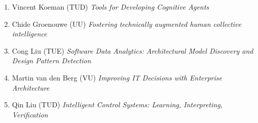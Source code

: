 \begin{multicols}{2}
\begin{scriptsize}
\begin{enumerate}[leftmargin=*,noitemsep,topsep=0pt,parsep=1pt,partopsep=0pt]
\item Vincent Koeman (TUD) \textit{Tools for Developing Cognitive Agents}
\item Chide Groenouwe (UU) \textit{Fostering technically augmented human collective intelligence}
\item Cong Liu (TUE) \textit{Software Data Analytics: Architectural Model Discovery and Design Pattern Detection}
\item Martin van den Berg (VU) \textit{Improving IT Decisions with Enterprise Architecture}
\item Qin Liu (TUD) \textit{Intelligent Control Systems: Learning, Interpreting, Verification}

\end{enumerate}



\end{scriptsize}
\end{multicols}
\restoregeometry